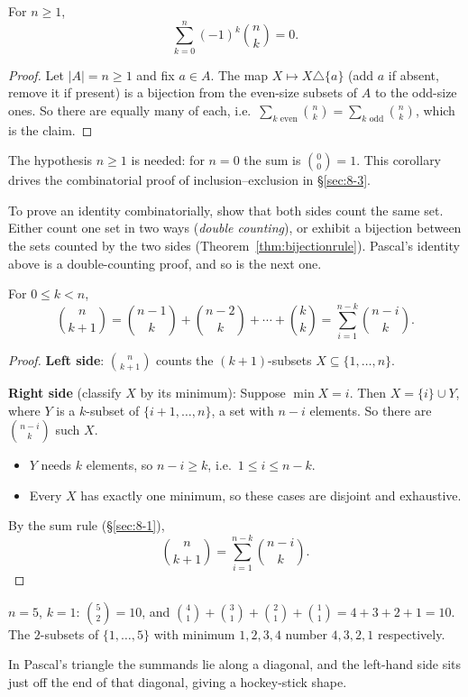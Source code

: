 \begin{corollary}
\label{thm:altsum}
For $n\ge1$,
\[
\sum_{k=0}^n(-1)^k\binom{n}{k}=0.
\]
\end{corollary}
\begin{proof}
Let $|A|=n\ge1$ and fix $a\in A$. The map $X\mapsto X\triangle\{a\}$ (add $a$ if absent, remove it if present) is a bijection from the even-size subsets of $A$ to the odd-size ones. So there are equally many of each, i.e.\ $\sum_{k \text{ even}}\binom nk=\sum_{k \text{ odd}}\binom nk$, which is the claim.
\end{proof}
\begin{note}[Why $n\ge1$]
The hypothesis $n\ge1$ is needed: for $n=0$ the sum is $\binom00=1$. This corollary drives the combinatorial proof of inclusion--exclusion in \S\ref{sec:8-3}.
\end{note}

\begin{note}
To prove an identity combinatorially, show that both sides count the same set. Either count one set in two ways (\emph{double counting}), or exhibit a bijection between the sets counted by the two sides (Theorem~\ref{thm:bijectionrule}). Pascal's identity above is a double-counting proof, and so is the next one.
\end{note}

\begin{proposition}
\label{thm:hockeystick}
For $0\le k<n$,
\[
\binom{n}{k+1}=\binom{n-1}{k}+\binom{n-2}{k}+\cdots+\binom{k}{k}=\sum_{i=1}^{n-k}\binom{n-i}{k}.
\]
\end{proposition}
\begin{proof}
\textbf{Left side}: $\binom{n}{k+1}$ counts the $(k+1)$-subsets $X\subseteq\{1,\dots,n\}$.

\textbf{Right side} (classify $X$ by its minimum): Suppose $\min X=i$. Then $X=\{i\}\cup Y$, where $Y$ is a $k$-subset of $\{i+1,\dots,n\}$, a set with $n-i$ elements. So there are $\binom{n-i}{k}$ such $X$.
\begin{itemize}
  \item $Y$ needs $k$ elements, so $n-i\ge k$, i.e.\ $1\le i\le n-k$.
  \item Every $X$ has exactly one minimum, so these cases are disjoint and exhaustive.
\end{itemize}

By the sum rule (\S\ref{sec:8-1}),
\[
\binom{n}{k+1}=\sum_{i=1}^{n-k}\binom{n-i}{k}.
\]
\end{proof}
\begin{example}
$n=5$, $k=1$: $\binom52=10$, and $\binom41+\binom31+\binom21+\binom11=4+3+2+1=10$. The $2$-subsets of $\{1,\dots,5\}$ with minimum $1,2,3,4$ number $4,3,2,1$ respectively.
\end{example}
\begin{note}[Name]
In Pascal's triangle the summands lie along a diagonal, and the left-hand side sits just off the end of that diagonal, giving a hockey-stick shape.
\end{note}

